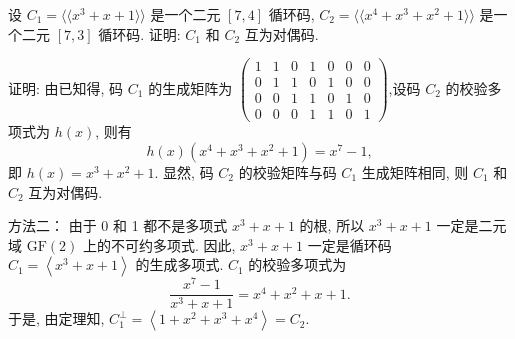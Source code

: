 \begin{exercise}
    设 $ C_{1}=\langle\langle x^{3}+x+1\rangle\rangle $ 是一个二元 $ [7,4] $ 循环码, $ C_{2}=\langle\langle x^{4}+x^{3}+x^{2}+1\rangle\rangle $ 是一个二元 $ [7,3] $ 循环码. 证明: $ C_{1} $ 和 $ C_{2} $ 互为对偶码.
\end{exercise}
\begin{solution}

证明: 由已知得, 码 $ C_{1} $ 的生成矩阵为 $ \left(\begin{array}{lllllll}1 & 1 & 0 & 1 & 0 & 0 & 0 \\ 0 & 1 & 1 & 0 & 1 & 0 & 0 \\ 0 & 0 & 1 & 1 & 0 & 1 & 0 \\ 0 & 0 & 0 & 1 & 1 & 0 & 1\end{array}\right) $,设码 $ C_{2} $ 的校验多项式为 $ h(x) $, 则有
$$
h(x)\left(x^{4}+x^{3}+x^{2}+1\right)=x^{7}-1,
$$
即 $ h(x)=x^{3}+x^{2}+1 $.
显然, 码 $ C_{2} $ 的校验矩阵与码 $ C_{1} $ 生成矩阵相同, 则 $ C_{1} $ 和 $ C_{2} $ 互为对偶码.

方法二： 由于 0 和 1 都不是多项式 $ x^{3}+x+1 $ 的根, 所以 $ x^{3}+x+1 $ 一定是二元域 $ \mathrm{GF}(2) $ 上的不可约多项式. 因此, $ x^{3}+x+1 $ 一定是循环码 $ C_{1}=\left\langle x^{3}+x+1\right\rangle $ 的生成多项式. $ C_{1} $ 的校验多项式为
$$
\frac{x^{7}-1}{x^{3}+x+1}=x^{4}+x^{2}+x+1 .
$$
于是, 由定理知, $ C_{1}^{\perp}=\left\langle 1+x^{2}+x^{3}+x^{4}\right\rangle=C_{2} $.

\end{solution}






